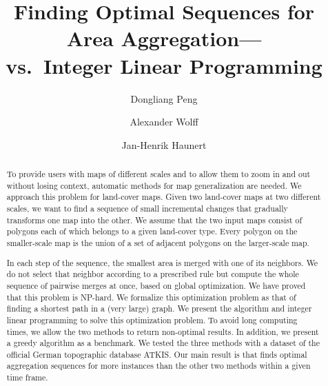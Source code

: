 \documentclass[acmsmall,natbib=false]{acmart}
\begin{document}
\title
[Finding Optimal Sequences for Area Aggregation] %
{Finding Optimal Sequences for Area Aggregation---\\
  \texorpdfstring
    {\Astar vs.\ Integer Linear Programming}%
    {A* vs.\ Integer Linear Programming}%
}
    


\author{Dongliang Peng}

\author{Alexander Wolff}

\author{Jan-Henrik Haunert}


\begin{abstract}
To provide users with maps of different scales and 
to allow them to zoom in and out without losing context,
automatic methods for map generalization are needed.
We approach this problem for land-cover maps.
Given two land-cover maps at two different scales, 
we want to find a sequence of small incremental
changes that gradually transforms one map into the other.
We assume that the two input maps consist of polygons 
each of which belongs to a given land-cover type. 
Every polygon on the smaller-scale map
is the union of a set of adjacent polygons 
on the larger-scale map. 

In each step of the  sequence, 
the smallest area is merged with one of its neighbors. 
We do not select that neighbor according to a prescribed rule 
but compute the whole sequence of pairwise merges at once, 
based on global optimization.
We have proved that this problem is NP-hard.
We formalize this optimization problem as that of 
finding a shortest path in a (very large) graph.
We present the \Astar algorithm and integer linear programming
to solve this optimization problem.
To avoid long computing times, we allow the two methods to 
return non-optimal results.
In addition, we present a greedy algorithm as a benchmark.
We tested the three methods with a
dataset of the official German topographic database ATKIS.
Our main result is that
\Astar finds optimal aggregation sequences for more instances 
than the other two methods
within a given time frame.
%
%
\end{abstract}
\end{document}

